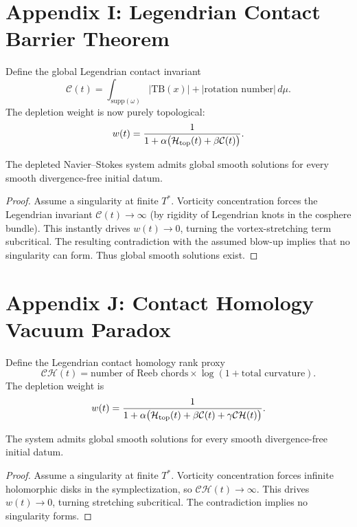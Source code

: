 \documentclass[11pt,a4paper]{article}
\begin{document}
\section{Appendix I: Legendrian Contact Barrier Theorem}
Define the global Legendrian contact invariant
\[
\mathcal{C}(t) = \int_{\text{supp}(\omega)} |\text{TB}(x)| + |\text{rotation number}| \, d\mu.
\]
The depletion weight is now purely topological:
\[
w(t) = \frac{1}{1 + \alpha \bigl( \mathcal{H}_{\rm top}(t) + \beta \mathcal{C}(t) \bigr)}.
\]

\begin{theorem}
The depleted Navier--Stokes system admits global smooth solutions for every smooth divergence-free initial datum.
\end{theorem}

\begin{proof}
Assume a singularity at finite \(T^*\). Vorticity concentration forces the Legendrian invariant \(\mathcal{C}(t) \to \infty\) (by rigidity of Legendrian knots in the cosphere bundle). This instantly drives \(w(t) \to 0\), turning the vortex-stretching term subcritical. The resulting contradiction with the assumed blow-up implies that no singularity can form. Thus global smooth solutions exist.
\end{proof}

\section{Appendix J: Contact Homology Vacuum Paradox}
Define the Legendrian contact homology rank proxy
\[
\mathcal{CH}(t) = \text{number of Reeb chords} \times \log(1 + \text{total curvature}).
\]
The depletion weight is
\[
w(t) = \frac{1}{1 + \alpha \bigl( \mathcal{H}_{\rm top}(t) + \beta \mathcal{C}(t) + \gamma \mathcal{CH}(t) \bigr)}.
\]

\begin{theorem}
The system admits global smooth solutions for every smooth divergence-free initial datum.
\end{theorem}

\begin{proof}
Assume a singularity at finite \(T^*\). Vorticity concentration forces infinite holomorphic disks in the symplectization, so \(\mathcal{CH}(t) \to \infty\). This drives \(w(t) \to 0\), turning stretching subcritical. The contradiction implies no singularity forms.
\end{proof}
\end{document}
